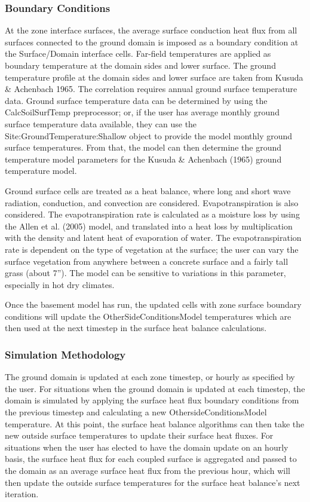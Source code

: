 \subsubsection{Boundary Conditions}\label{boundary-conditions--sitebc}

At the zone interface surfaces, the average surface conduction heat flux from all surfaces connected to the ground domain is imposed as a boundary condition at the Surface/Domain interface cells. Far-field temperatures are applied as boundary temperature at the domain sides and lower surface. The ground temperature profile at the domain sides and lower surface are taken from Kusuda \& Achenbach 1965. The correlation requires annual ground surface temperature data. Ground surface temperature data can be determined by using the CalcSoilSurfTemp preprocessor; or, if the user has average monthly ground surface temperature data available, they can use the Site:GroundTemperature:Shallow object to provide the model monthly ground surface temperatures. From that, the model can then determine the ground temperature model parameters for the Kusuda \& Achenbach (1965) ground temperature model.

Ground surface cells are treated as a heat balance, where long and short wave radiation, conduction, and convection are considered. Evapotranspiration is also considered. The evapotranspiration rate is calculated as a moisture loss by using the Allen et al. (2005) model, and translated into a heat loss by multiplication with the density and latent heat of evaporation of water. The evapotranspiration rate is dependent on the type of vegetation at the surface; the user can vary the surface vegetation from anywhere between a concrete surface and a fairly tall grass (about 7''). The model can be sensitive to variations in this parameter, especially in hot dry climates.

Once the basement model has run, the updated cells with zone surface boundary conditions will update the OtherSideConditionsModel temperatures which are then used at the next timestep in the surface heat balance calculations.

\subsubsection{Simulation Methodology}\label{simulation-methodology}

The ground domain is updated at each zone timestep, or hourly as specified by the user. For situations when the ground domain is updated at each timestep, the domain is simulated by applying the surface heat flux boundary conditions from the previous timestep and calculating a new OthersideConditionsModel temperature. At this point, the surface heat balance algorithms can then take the new outside surface temperatures to update their surface heat fluxes. For situations when the user has elected to have the domain update on an hourly basis, the surface heat flux for each coupled surface is aggregated and passed to the domain as an average surface heat flux from the previous hour, which will then update the outside surface temperatures for the surface heat balance's next iteration.


